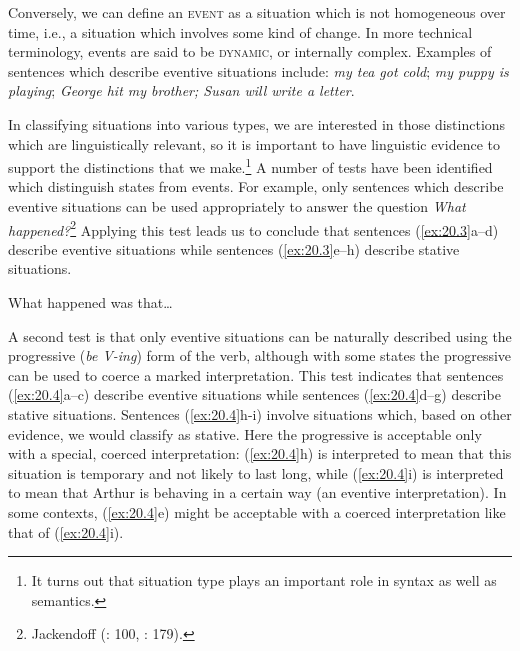 Conversely, we can define an \textsc{event} as a situation which is not homogeneous over time, i.e., a situation which involves some kind of change. In more technical terminology, events are said to be \textsc{dynamic}, or internally complex. Examples of sentences which describe eventive situations include: \textit{my tea got cold}; \textit{my puppy is playing}; \textit{George hit my brother; Susan will write a letter}.



In classifying situations into various types, we are interested in those distinctions which are linguistically relevant, so it is important to have linguistic evidence to support the distinctions that we make.\footnote{It turns out that situation type plays an important role in syntax as well as semantics.} A number of tests have been identified which distinguish states from events. For example, only sentences which describe eventive situations can be used appropriately to answer the question \textit{What happened?}\footnote{Jackendoff (\citeyear{Jackendoff1976}: 100, \citeyear{Jackendoff1983}: 179).} Applying this test leads us to conclude that sentences (\ref{ex:20.3}a--d) describe eventive situations while sentences (\ref{ex:20.3}e--h) describe stative situations.


\ea \label{ex:20.3}
What happened was that…\\
                       \z
\z


A second test is that only eventive situations can be naturally described using the progressive (\textit{be V-ing}) form of the verb, although with some states the progressive can be used to coerce a marked interpretation. This test indicates that sentences (\ref{ex:20.4}a--c) describe eventive situations while sentences (\ref{ex:20.4}d--g) describe stative situations. Sentences (\ref{ex:20.4}h-i) involve situations which, based on other evidence, we would classify as stative. Here the progressive is acceptable only with a special, coerced interpretation: (\ref{ex:20.4}h) is interpreted to mean that this situation is temporary and not likely to last long, while (\ref{ex:20.4}i) is interpreted to mean that Arthur is behaving in a certain way (an eventive interpretation). In some contexts, (\ref{ex:20.4}e) might be acceptable with a coerced interpretation like that of (\ref{ex:20.4}i).


